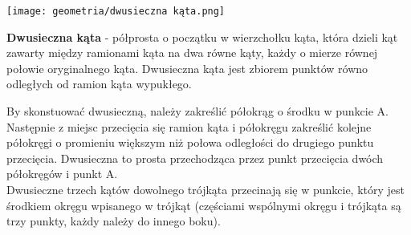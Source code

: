 \documentclass[14pt,a4paper]{extarticle}
\begin{document}
\begin{center}\texttt{[image: geometria/dwusieczna kąta.png]}\end{center}
\noindent \textbf{Dwusieczna kąta} - półprosta o początku w wierzchołku kąta, która dzieli kąt zawarty
między ramionami kąta na dwa równe kąty, każdy o mierze równej połowie oryginalnego kąta. Dwusieczna kąta
jest zbiorem punktów równo odległych od ramion kąta wypukłego.\\\MoveBelowBox\unskip

\noindent By skonstuować dwusieczną, należy zakreślić półokrąg o środku w punkcie A. Następnie
z miejsc przecięcia się ramion kąta i półokręgu zakreślić kolejne półokręgi o promieniu większym niż
połowa odległości do drugiego punktu przecięcia. Dwusieczna to prosta przechodząca przez punkt przecięcia 
dwóch półokręgów i punkt A.\\

\noindent Dwusieczne trzech kątów dowolnego trójkąta przecinają się w punkcie, który jest środkiem okręgu
wpisanego w trójkąt (częściami wspólnymi okręgu i trójkąta są trzy punkty, każdy należy do innego boku).
\end{document}
